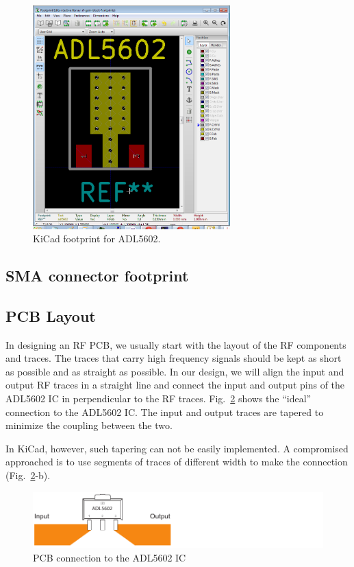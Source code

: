 \documentclass[12pt,letterpaper]{scrartcl}
\begin{document}
\begin{enumerate}
		\begin{figure}[ph]
			\centering
			\includegraphics[width=3in]{adl5602-footprint}
			\caption{KiCad footprint for ADL5602.}
			\label{fig:adl5602-footprint}
		\end{figure}
\end{enumerate}

\subsection{SMA connector footprint}

\subsection{PCB Layout}

In designing an RF PCB, we usually start with the layout of the RF components and traces. The traces that carry high frequency signals should be kept as short as possible and as straight as possible. In our design, we will align the input and output RF traces in a straight line and connect the input and output pins of the ADL5602 IC in perpendicular to the RF traces. Fig.~\ref{fig:adl5602-connection} shows the ``ideal'' connection to the ADL5602 IC. The input and output traces are tapered to minimize the coupling between the two. 

In KiCad, however, such tapering can not be easily implemented. A compromised approached is to use segments of traces of different width to make the connection (Fig.~\ref{fig:adl5602-connection}-b). 

\begin{figure}[ph]
	\centering
	\includegraphics{adl5602-connection}
	\caption{PCB connection to the ADL5602 IC}
	\label{fig:adl5602-connection}
\end{figure}
\end{document}
